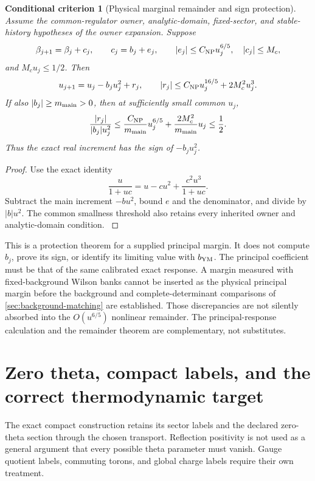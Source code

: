 \documentclass[11pt,oneside,openany]{book}
\newtheorem{criterion}[criterion]{Conditional criterion}
\theoremstyle{definition}
\theoremstyle{remark}
\newcommand{\src}[2]{\cite[#2]{#1}}
\begin{document}
\begin{criterion}[Physical marginal remainder and sign protection]\label{thm:remainder}
Assume the common-regulator owner, analytic-domain, fixed-sector, and stable-history hypotheses of the owner expansion. Suppose
\[
\beta_{j+1}=\beta_j+c_j,\qquad c_j=b_j+e_j,
\qquad |e_j|\le C_{\rm NP}u_j^{6/5},\quad |c_j|\le M_c,
\]
and $M_cu_j\le1/2$. Then
\begin{equation}\label{eq:physical-remainder}
u_{j+1}=u_j-b_ju_j^2+r_j,\qquad
|r_j|\le C_{\rm NP}u_j^{16/5}+2M_c^2u_j^3.
\end{equation}
If also $|b_j|\ge m_{\rm main}>0$, then at sufficiently small common $u_j$,
\begin{equation}\label{eq:sign-protection}
\frac{|r_j|}{|b_j|u_j^2}
\le\frac{C_{\rm NP}}{m_{\rm main}}u_j^{6/5}
+\frac{2M_c^2}{m_{\rm main}}u_j\le\frac12.
\end{equation}
Thus the exact real increment has the sign of $-b_ju_j^2$.
\end{criterion}
\begin{proof}
Use the exact identity
\[
\frac{u}{1+uc}=u-cu^2+\frac{c^2u^3}{1+uc}.
\]
Subtract the main increment $-bu^2$, bound $e$ and the denominator, and divide by $|b|u^2$. The common smallness threshold also retains every inherited owner and analytic-domain condition. \src{PAR}{V4}
\end{proof}

This is a protection theorem for a supplied principal margin. It does
not compute $b_j$, prove its sign, or identify its limiting value with
$b_{\rm YM}$. The principal coefficient must be that of the same calibrated
exact response. A margin measured with fixed-background Wilson banks
cannot be inserted as the physical principal margin before the background
and complete-determinant comparisons of \cref{sec:background-matching}
are established. Those discrepancies are not silently absorbed into the
$O(u^{6/5})$ nonlinear remainder. The principal-response calculation and the
remainder theorem are complementary, not substitutes.

\section{Zero theta, compact labels, and the correct thermodynamic target}
The exact compact construction retains its sector labels and the declared zero-theta section through the chosen transport. Reflection positivity is not used as a general argument that every possible theta parameter must vanish. Gauge quotient labels, commuting torons, and global charge labels require their own treatment.
\end{document}
